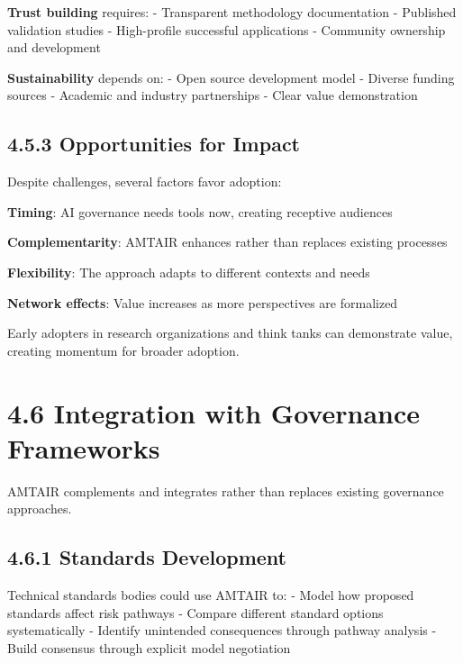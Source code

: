 \documentclass[
  11pt,
  letterpaper,
]{book}
\begin{document}
\textbf{Trust building} requires: - Transparent methodology
documentation - Published validation studies - High-profile successful
applications - Community ownership and development

\textbf{Sustainability} depends on: - Open source development model -
Diverse funding sources - Academic and industry partnerships - Clear
value demonstration

\subsection*{4.5.3 Opportunities for
Impact}\label{sec-impact-opportunities}

Despite challenges, several factors favor adoption:

\textbf{Timing}: AI governance needs tools now, creating receptive
audiences

\textbf{Complementarity}: AMTAIR enhances rather than replaces existing
processes

\textbf{Flexibility}: The approach adapts to different contexts and
needs

\textbf{Network effects}: Value increases as more perspectives are
formalized

Early adopters in research organizations and think tanks can demonstrate
value, creating momentum for broader adoption.

\section*{4.6 Integration with Governance
Frameworks}\label{sec-governance-integration}


AMTAIR complements and integrates rather than replaces existing
governance approaches.

\subsection*{4.6.1 Standards
Development}\label{sec-standards-integration}

Technical standards bodies could use AMTAIR to: - Model how proposed
standards affect risk pathways - Compare different standard options
systematically - Identify unintended consequences through pathway
analysis - Build consensus through explicit model negotiation
\end{document}
